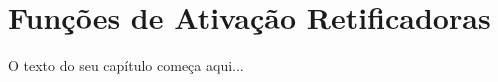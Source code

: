 
\chapter{Funções de Ativação Retificadoras}
\label{cap:ativacao-retificadoras}

O texto do seu capítulo começa aqui...